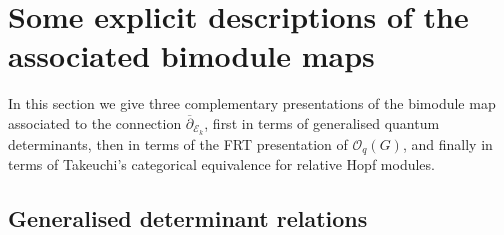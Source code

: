 \documentclass[10pt,a4paper]{amsart}
\numberwithin{equation}{section}
\newcommand\adel{\overline{\partial}}
\begin{document}

\section{Some explicit descriptions of the associated bimodule maps}\label{section4}

In this section we give three complementary presentations of the bimodule map associated to the connection $\adel_{\mathcal{E}_k}$, first in terms of generalised quantum determinants, then in terms of the FRT presentation of $\mathcal{O}_q(G)$, and finally in terms of Takeuchi's categorical equivalence for relative Hopf modules.

\subsection{Generalised determinant relations} \label{textsection:genDets}
\end{document}
